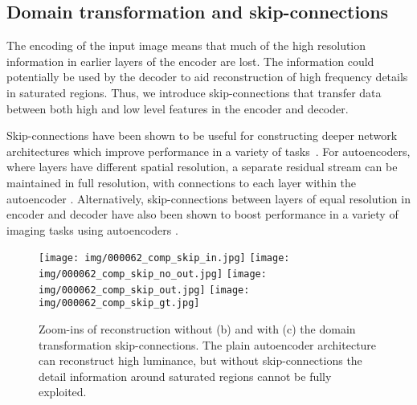 \documentclass[acmtog]{acmart}
\newcommand\belowfigspace{-2pt}
\begin{document}
\subsection{Domain transformation and skip-connections}
The encoding of the input image means that much of the high resolution information in earlier layers of the encoder are lost.
The information could potentially be used by the decoder to aid reconstruction of high frequency details in saturated regions.
Thus, we introduce skip-connections that transfer data between both high and low level features in the encoder and decoder. 

Skip-connections have been shown to be useful for constructing deeper network architectures which improve performance in a variety of tasks~\cite{He2016}. For autoencoders, where layers have different spatial resolution, a separate residual stream can be maintained in full resolution, with connections to each layer within the autoencoder \cite{Pohlen2016}. Alternatively, skip-connections between layers of equal resolution in encoder and decoder have also been shown to boost performance in a variety of imaging tasks using autoencoders \cite{Ronneberger2015,Zhang2017}.

\begin{figure}[t]
	\vspace{5pt}
	\newcommand\ww{0.116}
	\centering
	\texttt{[image: img/000062\_comp\_skip\_in.jpg]}
	\texttt{[image: img/000062\_comp\_skip\_no\_out.jpg]}
	\texttt{[image: img/000062\_comp\_skip\_out.jpg]}
	\texttt{[image: img/000062\_comp\_skip\_gt.jpg]}\\
	\vspace{-2pt}
	\vspace{-10pt}
	\caption{\label{fig:skip} Zoom-ins of reconstruction without (b) and with (c) the domain transformation skip-connections. The plain autoencoder architecture can reconstruct high luminance, but without skip-connections the detail information around saturated regions cannot be fully exploited.}
	\vspace{\belowfigspace}
\end{figure}
\end{document}
